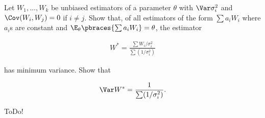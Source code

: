 
\begin{exercise}

Let $W_1, \dots, W_k$ be unbiased estimators of a parameter $\theta$ with $\Var \sigma_i^2$ and $\Cov(W_i, W_j) = 0$ if $i \neq j$.
Show that, of all estimators of the form $\sum a_i W_i$ where $a_i$s are constant and $\E_\theta \pbraces{\sum a_i W_i} = \theta$, the estimator

\begin{align*}
    W^\ast
    =
    \frac
    {
        \sum W_i / \sigma_i^2
    }{
        \sum (1 / \sigma_i^2)
    }
\end{align*}

has minimum variance.
Show that

\begin{align*}
    \Var W^\ast
    =
    \frac
    {
        1
    }{
        \sum (1 / \sigma_i^2)
    }.
\end{align*}

\end{exercise}


\begin{solution}

ToDo!

\end{solution}

